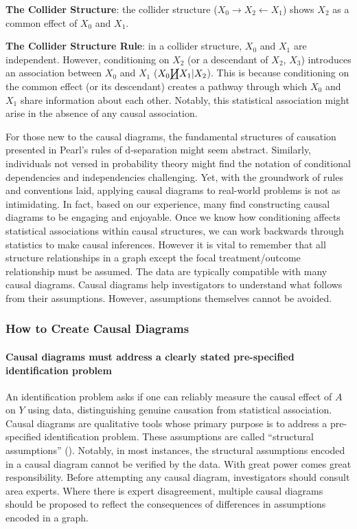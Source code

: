 \documentclass[
  singlecolumn]{article}
\let\oldparagraph\paragraph
\renewcommand{\paragraph}[1]{\oldparagraph{#1}\mbox{}}
\begin{document}
\textbf{The Collider Structure}: the collider structure
(\(X_0 \rightarrow X_2 \leftarrow X_1\)) shows \(X_2\) as a common
effect of \(X_0\) and \(X_1\).

\textbf{The Collider Structure Rule}: in a collider structure, \(X_0\)
and \(X_1\) are independent. However, conditioning on \(X_2\) (or a
descendant of \(X_2\), \(X_3\)) introduces an association between
\(X_0\) and \(X_1\) (\(X_0 \cancel\coprod X_1 | X_2\)). This is because
conditioning on the common effect (or its descendant) creates a pathway
through which \(X_0\) and \(X_1\) share information about each other.
Notably, this statistical association might arise in the absence of any
causal association.

For those new to the causal diagrams, the fundamental structures of
causation presented in Pearl's rules of d-separation might seem
abstract. Similarly, individuals not versed in probability theory might
find the notation of conditional dependencies and independencies
challenging. Yet, with the groundwork of rules and conventions laid,
applying causal diagrams to real-world problems is not as intimidating.
In fact, based on our experience, many find constructing causal diagrams
to be engaging and enjoyable. Once we know how conditioning affects
statistical associations within causal structures, we can work backwards
through statistics to make causal inferences. However it is vital to
remember that all structure relationships in a graph except the focal
treatment/outcome relationship must be assumed. The data are typically
compatible with many causal diagrams. Causal diagrams help investigators
to understand what follows from their assumptions. However, assumptions
themselves cannot be avoided.

\subsubsection{How to Create Causal
Diagrams}\label{how-to-create-causal-diagrams}

\paragraph{Causal diagrams must address a clearly stated pre-specified
identification
problem}\label{causal-diagrams-must-address-a-clearly-stated-pre-specified-identification-problem}

An identification problem asks if one can reliably measure the causal
effect of \(A\) on \(Y\) using data, distinguishing genuine causation
from statistical association. Causal diagrams are qualitative tools
whose primary purpose is to address a pre-specified identification
problem. These assumptions are called ``structural assumptions''
(). Notably, in
most instances, the structural assumptions encoded in a causal diagram
cannot be verified by the data. With great power comes great
responsibility. Before attempting any causal diagram, investigators
should consult area experts. Where there is expert disagreement,
multiple causal diagrams should be proposed to reflect the consequences
of differences in assumptions encoded in a graph.
\end{document}
